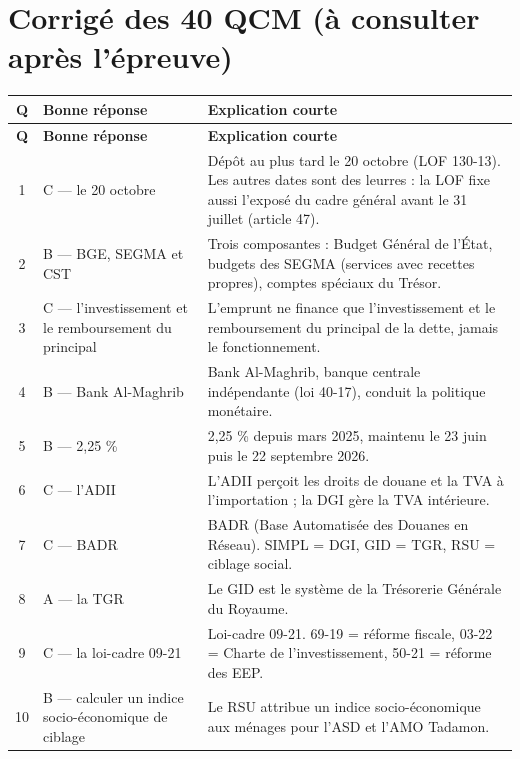 \newpage
\section{Corrigé des 40 QCM (à consulter après l'épreuve)}

{\small
\begin{longtable}{|c|>{\raggedright\arraybackslash}p{4.6cm}|p{9.2cm}|}
\hline
\rowcolor{gray!20} \textbf{Q} & \textbf{Bonne réponse} & \textbf{Explication courte} \\ \hline
\endfirsthead
\hline
\rowcolor{gray!20} \textbf{Q} & \textbf{Bonne réponse} & \textbf{Explication courte} \\ \hline
\endhead
1 & C --- le 20 octobre & Dépôt au plus tard le 20 octobre (LOF 130-13). Les autres dates sont des leurres : la LOF fixe aussi l'exposé du cadre général avant le 31 juillet (article 47). \\ \hline
2 & B --- BGE, SEGMA et CST & Trois composantes : Budget Général de l'État, budgets des SEGMA (services avec recettes propres), comptes spéciaux du Trésor. \\ \hline
3 & C --- l'investissement et le remboursement du principal & L'emprunt ne finance que l'investissement et le remboursement du principal de la dette, jamais le fonctionnement. \\ \hline
4 & B --- Bank Al-Maghrib & Bank Al-Maghrib, banque centrale indépendante (loi 40-17), conduit la politique monétaire. \\ \hline
5 & B --- 2,25 \% & 2,25 \% depuis mars 2025, maintenu le 23 juin puis le 22 septembre 2026. \\ \hline
6 & C --- l'ADII & L'ADII perçoit les droits de douane et la TVA à l'importation ; la DGI gère la TVA intérieure. \\ \hline
7 & C --- BADR & BADR (Base Automatisée des Douanes en Réseau). SIMPL = DGI, GID = TGR, RSU = ciblage social. \\ \hline
8 & A --- la TGR & Le GID est le système de la Trésorerie Générale du Royaume. \\ \hline
9 & C --- la loi-cadre 09-21 & Loi-cadre 09-21. 69-19 = réforme fiscale, 03-22 = Charte de l'investissement, 50-21 = réforme des EEP. \\ \hline
10 & B --- calculer un indice socio-économique de ciblage & Le RSU attribue un indice socio-économique aux ménages pour l'ASD et l'AMO Tadamon. \\ \hline

\end{longtable}}
